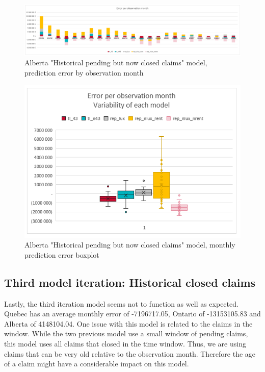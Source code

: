 		\begin{figure}[H]
			\begin{center}
				\includegraphics[scale=0.4]{Graphiques/AB_closedonly_model_by_month} 
				\renewcommand{\figurename}{Figure}
				\caption{Alberta "Historical  pending but now closed claims" model, prediction error by observation month}\label{Fig_AB_closedonly_er_by_month}
			\end{center}
		\end{figure}
		\begin{figure}[H]
			\begin{center}
				\includegraphics[scale=0.4]{Graphiques/AB_closedonly_model_mustach} 
				\renewcommand{\figurename}{Figure}
				\caption{Alberta "Historical  pending but now closed claims" model, monthly prediction error boxplot}\label{Fig_AB_closedonly_er_boxplot}
			\end{center}
		\end{figure}
	
\subsection{Third model iteration: Historical closed claims }
	Lastly, the third iteration model seems not to function as well as expected. Quebec has an average monthly error of -7196717.05, Ontario of -13153105.83 and Alberta of 4148104.04. One issue with this model is related to the claims in the window. While the two previous model use a small window of pending claims, this model uses all claims that closed in the time window. Thus, we are using claims that can be very old relative to the observation month. Therefore the age of a claim might have a considerable impact on this model.
	
	
		 